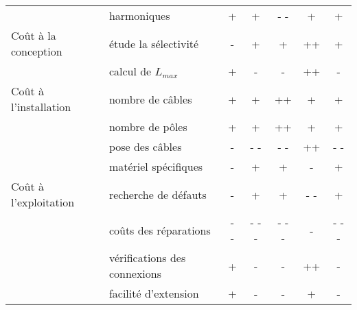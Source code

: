 \begin{landscape}
\begin{xltabular}{\linewidth}{X l c c c c c}
														& harmoniques						&  + & + & - - & + & + \\
\addlinespace
Coût à la conception					 		& étude la sélectivité 			& - & + & + & ++ & + \\
														& calcul de $L_{max}$			& + & - & - & ++ & - \\
\addlinespace
Coût à l'installation					 		& nombre de câbles	 			& + & + & ++ & + & + \\
														& nombre de pôles		 			& + & + & ++ & + & + \\
														& pose des câbles		 			& - & - - & - - & ++ & - - \\
														& matériel spécifiques	 		& - & + & + & - & + \\
\addlinespace
Coût à l'exploitation							& recherche de défauts			& - & + & + & - - & + \\
														& coûts des réparations			& - - & - - - & - - - & - &  - - - \\
														& vérifications des connexions& + & - & - & ++ & - \\
														& facilité d'extension				& + & - & - & + & - \\
\end{xltabular}

\end{landscape}

%

